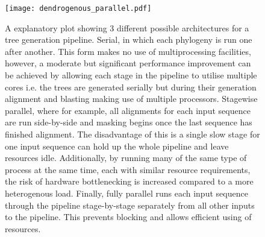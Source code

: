 \begin{figure}
    \texttt{[image: dendrogenous\_parallel.pdf]}
    \caption{A explanatory plot showing 3 different possible architectures for a tree generation pipeline. 
        Serial, in which each phylogeny is run one after another.  This form makes no use of multiprocessing
        facilities, however, a moderate but significant performance improvement can be achieved by allowing
        each stage in the pipeline to utilise multiple cores i.e. the trees are generated serially but during
        their generation alignment and blasting making use of multiple processors.          
        Stagewise parallel, where for example, all alignments for each input sequence are run side-by-side 
        and masking begins once the last sequence has finished alignment.  The disadvantage of this is a single
        slow stage for one input sequence can hold up the whole pipeline and leave resources idle.  Additionally,
        by running many of the same type of process at the same time, each with similar resource requirements,
        the risk of hardware bottlenecking is increased compared to a more heterogenous load.
        Finally, fully parallel runs each input sequence through the pipeline stage-by-stage separately
    from all other inputs to the pipeline. This prevents blocking and allows efficient using of resources.}
    \label{fig:ddg}
\end{figure}

